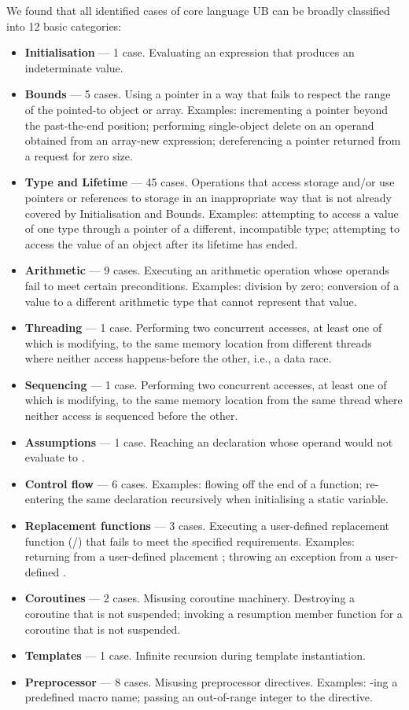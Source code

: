 We found that all identified cases of core language UB can be broadly classified into 12 basic categories:
\begin{itemize}
\item \textbf{Initialisation} --- 1 case. Evaluating an expression that produces an indeterminate value.
\item \textbf{Bounds} --- 5 cases. Using a pointer in a way that fails to respect the range of the pointed-to object or array. Examples: incrementing a pointer beyond the past-the-end position; performing single-object delete on an operand obtained from an array-new expression;  dereferencing a pointer returned from a request for zero size.
\item \textbf{Type and Lifetime} --- 45 cases. Operations that access storage and/or use pointers or references to storage in an inappropriate way that is not already covered by Initialisation and Bounds. Examples: attempting to access a value of one type through  a pointer of a different, incompatible type; attempting to access the value of an object after its lifetime has ended. 
\item \textbf{Arithmetic} --- 9 cases. Executing an arithmetic operation whose operands fail to meet certain preconditions. Examples: division by zero; conversion of a value to a different arithmetic type that cannot represent that value. 
\item \textbf{Threading} --- 1 case. Performing two concurrent accesses, at least one of which is modifying, to the same memory location from different threads where neither access happens-before the other, i.e., a data race.
\item \textbf{Sequencing} --- 1 case. Performing two concurrent accesses, at least one of which is modifying, to the same memory location from the same thread where neither access is sequenced before the other.
\item \textbf{Assumptions} --- 1 case. Reaching an \tcode{[[assume]]} declaration whose operand would not evaluate to .
\item \textbf{Control flow} --- 6 cases. Examples: flowing off the end of a function; re-entering the same declaration recursively when initialising a static variable.
\item \textbf{Replacement functions} --- 3 cases. Executing a user-defined replacement function (/) that fails to meet the specified requirements. Examples: returning  from a user-defined placement ; throwing an exception from a user-defined .
\item \textbf{Coroutines} --- 2 cases. Misusing coroutine machinery. Destroying a coroutine that is not suspended; invoking a resumption member function for a coroutine that is not suspended.
\item \textbf{Templates} --- 1 case. Infinite recursion during template instantiation.
\item \textbf{Preprocessor} --- 8 cases. Misusing preprocessor directives. Examples: -ing a predefined macro name; passing an out-of-range integer to the  directive.
\end{itemize}

